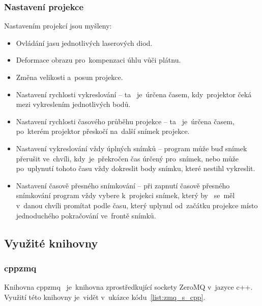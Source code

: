 \subsubsection{Nastavení projekce}
Nastavením projekcí jsou myšleny:
\begin{itemize}
\item Ovládání jasu jednotlivých laserových diod.
\item Deformace obrazu  pro~kompenzaci úhlu vůči plátnu.
\item Změna velikosti  a~posun projekce. 
\item Nastavení rychlosti vykreslování -- ta ~je~úrčena časem,  kdy~projektor čeká mezi vykreslením jednotlivých bodů.
\item Nastavení rychlosti časového průběhu projekce -- ta ~je~úrčena časem, po~kterém projektor přeskočí na~další snímek projekce.
\item Nastavení vykreslování vždy úplných snímků -- program může buď snímek přerušit ve~chvíli,  kdy~je~překročen čas úrčený  pro~snímek, nebo může po~uplynutí tohoto času vždy dokreslit body snímku, které nestihl vykreslit.
\item Nastavení časově přesného snímkování -- při zapnutí časově přesného snímkování program vždy vybere  k~projekci snímek, který by ~se~měl  v~danou chvíli promítat podle času, který uplynul od~začátku projekce místo jednoduchého pokračování ve~frontě snímků.
\end{itemize}



\subsection{Využité knihovny}
\subsubsection{cppzmq}\label{sec:ls_cppzmq}
Knihovna cppzmq~\cite{cppzmq} je~knihovna zprostředkující sockety ZeroMQ  v~jazyce c++. Využití této knihovny je~vidět  v~ukázce kódu~\ref{list:zmq_s_cpp}.
\begin{code}
  \inputminted[frame=lines,fontsize=\footnotesize{}, linenos, breaklines]{cpp}{code_examples/zmq_server.cpp}
\end{code}

